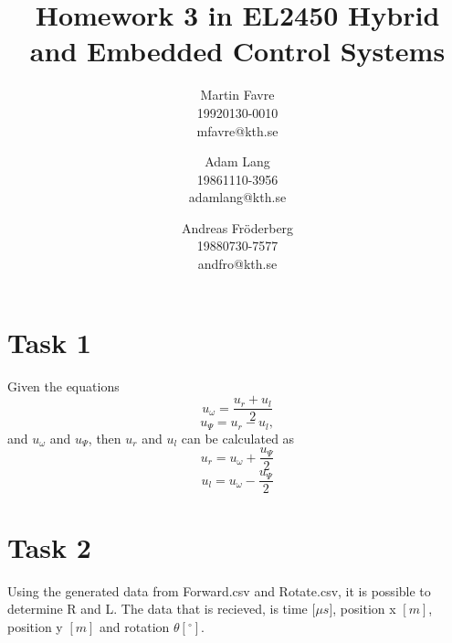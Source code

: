 \documentclass[a4paper,12pt,oneside,onecolumn]{article} %
\begin{document}

\title{Homework 3 in EL2450 Hybrid and Embedded Control Systems}
\author{
  Martin Favre \\ 19920130-0010 \\ mfavre@kth.se 
  \and 
  Adam Lang \\ 19861110-3956 \\ adamlang@kth.se
  \and
  Andreas Fr\"oderberg \\ 19880730-7577 \\ andfro@kth.se
  \and
  }

\maketitle                     %


\section*{Task 1}


Given the equations 
	\begin{equation}
		u_\omega = \frac{u_r + u_l}{2}
	\end{equation}
	\begin{equation}
		u_\Psi = u_r-u_l,
	\end{equation}
and $u_\omega$ and $u_\Psi$, then $u_r$ and $u_l$ can be calculated as
	\begin{equation}
		u_r = u_\omega + \frac{u_\Psi}{2}
	\end{equation}
	\begin{equation}
		u_l =  u_\omega-\frac{u_\Psi}{2}
	\end{equation}
	
\section*{Task 2}

Using the generated data from Forward.csv and Rotate.csv, it is possible
to determine R and L. The data that is recieved, is time $[\mu$$s]$,
position x $[m]$, position y $[m]$ and rotation $\theta$$[^{\circ}]$.
\end{document}
